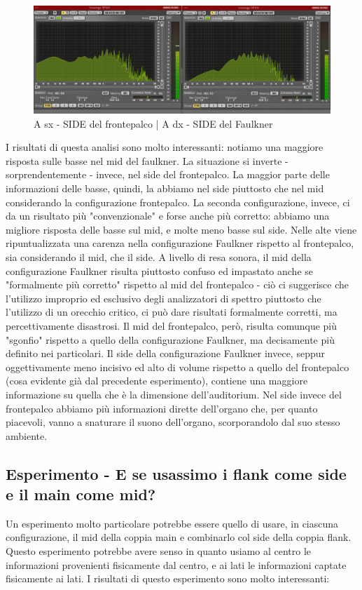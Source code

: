 \documentclass{article}
\begin{document}
    \begin{figure}[H]
        \centering
        \includegraphics[width=1\textwidth]{images/5PLOT-SIDE.png}
         \caption{\label{fig11}A sx - SIDE del frontepalco | A dx - SIDE del Faulkner}
    \end{figure}
    
    I risultati di questa analisi sono molto interessanti: notiamo una maggiore risposta sulle basse nel mid del faulkner. La situazione si inverte - sorprendentemente - invece, nel side del frontepalco. La maggior parte delle informazioni delle basse, quindi, la abbiamo nel side piuttosto che nel mid considerando la configurazione frontepalco. La seconda configurazione, invece, ci da un risultato più "convenzionale" e forse anche più corretto: abbiamo una migliore risposta delle basse sul mid, e molte meno basse sul side.
    Nelle alte viene ripuntualizzata una carenza nella configurazione Faulkner rispetto al frontepalco, sia considerando il mid, che il side.
    A livello di resa sonora, il mid della configurazione Faulkner risulta piuttosto confuso ed impastato anche se "formalmente più corretto" rispetto al mid del frontepalco - ciò ci suggerisce che l'utilizzo improprio ed esclusivo degli analizzatori di spettro piuttosto che l'utilizzo di un orecchio critico, ci può dare risultati formalmente corretti, ma percettivamente disastrosi. Il mid del frontepalco, però, risulta comunque più "sgonfio" rispetto a quello della configurazione Faulkner, ma decisamente più definito nei particolari.
    Il side della configurazione Faulkner invece, seppur oggettivamente meno incisivo ed alto di volume rispetto a quello del frontepalco (cosa evidente già dal precedente esperimento), contiene una maggiore informazione su quella che è la dimensione dell'auditorium. Nel side invece del frontepalco abbiamo più informazioni dirette dell'organo che, per quanto piacevoli, vanno a snaturare il suono dell'organo, scorporandolo dal suo stesso ambiente.
    
\subsection{Esperimento - E se usassimo i flank come side e il main come mid?}
    Un esperimento molto particolare potrebbe essere quello di usare, in ciascuna configurazione, il mid della coppia main e combinarlo col side della coppia flank. Questo esperimento potrebbe avere senso in quanto usiamo al centro le informazioni provenienti fisicamente dal centro, e ai lati le informazioni captate fisicamente ai lati.
    I risultati di questo esperimento sono molto interessanti:
    
\end{document}
